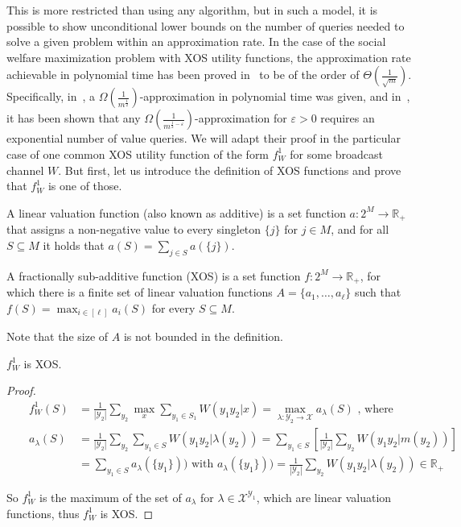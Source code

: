 This is more restricted than using any algorithm, but in such a model, it is possible to show unconditional lower bounds on the number of queries needed to solve a given problem within an approximation rate. In the case of the social welfare maximization problem with \textrm{XOS} utility functions, the approximation rate achievable in polynomial time has been proved in~\cite{DS06,MSV08} to be of the order of $\Theta\left(\frac{1}{\sqrt{m}}\right)$. Specifically, in~\cite{DS06}, a $\Omega\left(\frac{1}{m^{\frac{1}{2}}}\right)$-approximation in polynomial time was given, and in~\cite{MSV08}, it has been shown that any $\Omega\left(\frac{1}{m^{\frac{1}{2}-\varepsilon}}\right)$-approximation for $\varepsilon > 0$ requires an exponential number of value queries. We will adapt their proof in the particular case of one common \textrm{XOS} utility function of the form $f_W^1$ for some broadcast channel $W$. But first, let us introduce the definition of \textrm{XOS} functions and prove that $f_W^1$ is one of those.

\begin{defi}
  A linear valuation function (also known as additive) is a set function $a : 2^M \rightarrow \mathbb{R}_+$ that assigns a non-negative value to every singleton $\{ j\}$ for $j \in M$, and for all $S \subseteq M$ it holds that $a(S) = \sum_{j \in S} a(\{ j\})$.

  A fractionally sub-additive function (\textrm{XOS}) is a set function $f : 2^M \rightarrow \mathbb{R}_+$, for which there is a finite set of linear valuation functions $A = \{ a_1, \ldots, a_{\ell} \}$ such that $f(S) = \max_{i \in [\ell]} a_i(S)$ for every $S \subseteq M$.
\end{defi}

\begin{rk}
  Note that the size of $A$ is not bounded in the definition. 
\end{rk}

\begin{prop}
  $f_W^1$ is \textrm{XOS}.
\end{prop}
\begin{proof}
  \begin{equation}
    \begin{aligned}
      &&f_W^1(S) &= \frac{1}{|\mathcal{Y}_2|}\sum_{y_2} \max_x \sum_{y_1 \in S_1} W(y_1y_2|x) = \max_{\lambda : \mathcal{Y}_2 \rightarrow \mathcal{X}} a_{\lambda}(S) \text{ , where}\\
      &&a_{\lambda}(S) &= \frac{1}{|\mathcal{Y}_2|}\sum_{y_2}  \sum_{y_1 \in S} W(y_1y_2|\lambda(y_2)) = \sum_{y_1 \in S} \left[\frac{1}{|\mathcal{Y}_2|}\sum_{y_2}  W(y_1y_2|m(y_2))\right]\\
      &&&= \sum_{y_1 \in S} a_{\lambda}(\{ y_1 \})) \text{ with } a_{\lambda}(\{ y_1 \})) = \frac{1}{|\mathcal{Y}_2|}\sum_{y_2}  W(y_1y_2|\lambda(y_2)) \in \mathbb{R}_+
      \end{aligned}
  \end{equation}

  So $f_W^1$ is the maximum of the set of $a_{\lambda}$ for $\lambda \in \mathcal{X}^{\mathcal{Y}_1}$, which are linear valuation functions, thus $f_W^1$ is \textrm{XOS}.
\end{proof}

